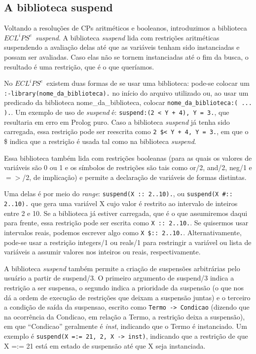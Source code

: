\documentclass{article}
\newcommand{\eclipse}{$ECL^iPS^e$}
\begin{document}
\subsection{A biblioteca suspend}

Voltando a resoluções de CPs aritméticos e booleanos, introduzimos a biblioteca \eclipse\ \textit{suspend}. A biblioteca \textit{suspend} lida com restrições aritméticas suspendendo a avaliação delas até que as variáveis tenham sido instanciadas e possam ser avaliadas. Caso elas não se tornem instanciadas até o fim da busca, o resultado é uma restrição, que é o que queríamos.

No \eclipse\ existem duas formas de se usar uma biblioteca: pode-se colocar um {\tt :-library(nome\_da\_biblioteca).} no início do arquivo utilizado ou, ao usar um predicado da biblioteca nome\_da\_biblioteca, colocar {\tt nome\_da\_biblioteca:( ... ).}. Um exemplo de uso de \textit{suspend} é: {\tt suspend:(2 < Y + 4), Y = 3.}, que resultaria em erro em Prolog puro. Caso a biblioteca \textit{suspend} já tenha sido carregada, essa restrição pode ser reescrita como {\tt 2 \$< Y + 4, Y = 3.},
em que o \$ indica que a restrição é usada tal como na biblioteca \textit{suspend}.

Essa biblioteca também lida com restrições booleanas (para as quais os valores de variáveis são 0 ou 1 e os símbolos de restrições são tais como or/2, and/2, neg/1 e $=>$/2, de implicação) e permite a declaração de variáveis de formas distintas.

Uma delas é por meio do \textit{range}: {\tt suspend(X :: 2..10).}, ou {\tt suspend(X \#:: 2..10).}  %
que gera uma variável X cujo valor é restrito ao intervalo de inteiros entre 2 e 10. Se a biblioteca já estiver carregada, que é o que assumiremos daqui para frente, essa restrição pode ser escrita como {\tt X :: 2..10.}. %
Se quisermos usar intervalos reais, podemos escrever algo como {\tt X \$:: 2..10.}.
Alternativamente, pode-se usar a restrição integers/1 ou reals/1 para restringir a variável ou lista de variáveis a assumir valores nos inteiros ou reais, respectivamente.



A biblioteca \textit{suspend} também permite a criação de suspensões arbitrárias pelo usuário a partir de suspend/3. O primeiro argumento de suspend/3 indica a restrição a ser suspensa, o segundo indica a prioridade da suspensão (o que nos dá a ordem de execução de restrições que deixam a suspensão juntas) e o terceiro a condição de saída da suspensao, escrito como {\tt Termo -> Condicao} (dizendo que na ocorrência da Condicao, em relação a Termo, a restrição deixa a suspensão), em que ``Condicao'' geralmente é \textit{inst}, indicando que o Termo é instanciado.
Um exemplo é {\tt suspend(X =:= 21, 2, X -> inst)}, indicando que a restrição de que X =:= 21 está em estado de suspensão até que X seja instanciada.
\end{document}
